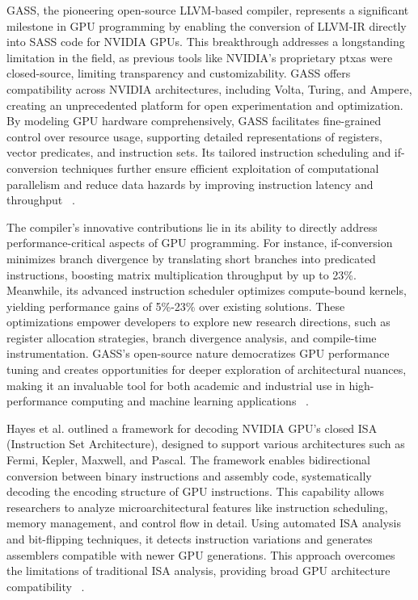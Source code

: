GASS, the pioneering open-source LLVM-based compiler, represents a significant milestone in GPU programming by enabling the conversion of LLVM-IR directly into SASS code for NVIDIA GPUs. This breakthrough addresses a longstanding limitation in the field, as previous tools like NVIDIA's proprietary ptxas were closed-source, limiting transparency and customizability. GASS offers compatibility across NVIDIA architectures, including Volta, Turing, and Ampere, creating an unprecedented platform for open experimentation and optimization. By modeling GPU hardware comprehensively, GASS facilitates fine-grained control over resource usage, supporting detailed representations of registers, vector predicates, and instruction sets. Its tailored instruction scheduling and if-conversion techniques further ensure efficient exploitation of computational parallelism and reduce data hazards by improving instruction latency and throughput ~\cite{Yan2022}.

The compiler's innovative contributions lie in its ability to directly address performance-critical aspects of GPU programming. For instance, if-conversion minimizes branch divergence by translating short branches into predicated instructions, boosting matrix multiplication throughput by up to 23\%. Meanwhile, its advanced instruction scheduler optimizes compute-bound kernels, yielding performance gains of 5\%-23\% over existing solutions. These optimizations empower developers to explore new research directions, such as register allocation strategies, branch divergence analysis, and compile-time instrumentation. GASS’s open-source nature democratizes GPU performance tuning and creates opportunities for deeper exploration of architectural nuances, making it an invaluable tool for both academic and industrial use in high-performance computing and machine learning applications ~\cite{Yan2022}.

Hayes et al. outlined a framework for decoding NVIDIA GPU's closed ISA (Instruction Set Architecture), designed to support various architectures such as Fermi, Kepler, Maxwell, and Pascal. The framework enables bidirectional conversion between binary instructions and assembly code, systematically decoding the encoding structure of GPU instructions. This capability allows researchers to analyze microarchitectural features like instruction scheduling, memory management, and control flow in detail. Using automated ISA analysis and bit-flipping techniques, it detects instruction variations and generates assemblers compatible with newer GPU generations. This approach overcomes the limitations of traditional ISA analysis, providing broad GPU architecture compatibility ~\cite{Hayes2019}.

